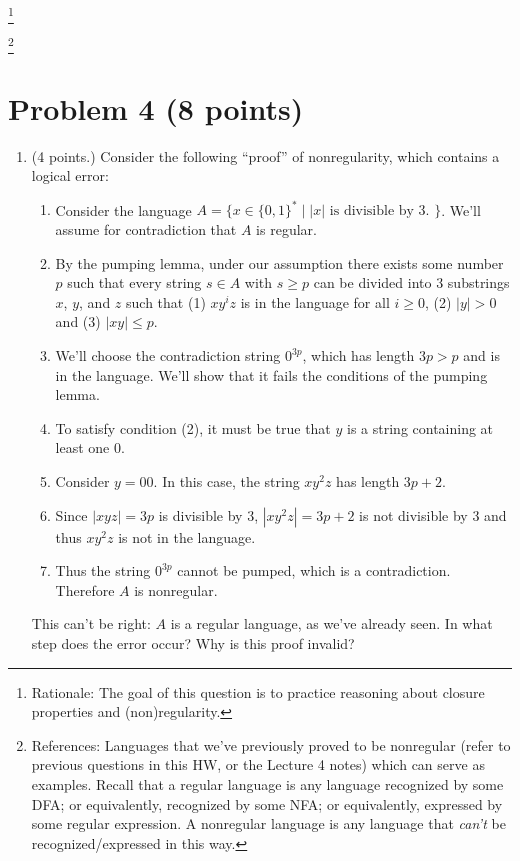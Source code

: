 \documentclass[letterpaper,11pt,twoside]{article}
\theoremstyle{plain}
\theoremstyle{definition}
\theoremstyle{remark}
\theoremstyle{restate}
\newcommand\blfootnote[1]{%
  \begingroup
  \renewcommand\thefootnote{}\footnote{#1}%
  \addtocounter{footnote}{-1}%
  \endgroup
}
\begin{document}
    \blfootnote{ Rationale: The goal of this question is to practice reasoning about closure properties and (non)regularity. }
    \blfootnote{ References: Languages that we've previously proved to be nonregular (refer to previous questions in this HW, or the Lecture 4 notes) which can serve as examples. Recall that a regular language is any language recognized by some DFA; or equivalently, recognized by some NFA; or equivalently, expressed by some regular expression. A nonregular language is any language that \emph{can't} be recognized/expressed in this way. }

\clearpage
\section{Problem 4 (8 points) }

\begin{enumerate}
    \item (4 points.) Consider the following ``proof'' of nonregularity, which contains a logical error:

    \begin{enumerate}
        \item Consider the language $A = \{x \in \{0,1\}^* \; | \; |x| \text{ is divisible by 3. } \}$. We'll assume for contradiction that $A$ is regular.
        \item By the pumping lemma, under our assumption there exists some number $p$ such that every string $s \in A$ with $s \geq p$ can be divided into 3 substrings $x$, $y$, and $z$ such that (1) $xy^iz$ is in the language for all $i \geq 0$, (2) $|y| > 0$ and (3) $|xy| \leq p$.
        \item We'll choose the contradiction string $0^{3p}$, which has length $3p > p$ and is in the language. We'll show that it fails the conditions of the pumping lemma.
        \item To satisfy condition (2), it must be true that $y$ is a string containing at least one $0$.
        \item Consider $y = 00$. In this case, the string $xy^2z$ has length $3p + 2$.
        \item Since $|xyz| = 3p$ is divisible by 3, $|xy^2z| = 3p + 2$ is not divisible by 3 and thus $x y^2 z$ is not in the language. 
        \item Thus the string $0^{3p}$ cannot be pumped, which is a contradiction. Therefore $A$ is nonregular.
    \end{enumerate}

    This can't be right: $A$ is a regular language, as we've already seen. In what step does the error occur? Why is this proof invalid?
    

\end{enumerate}
\end{document}
